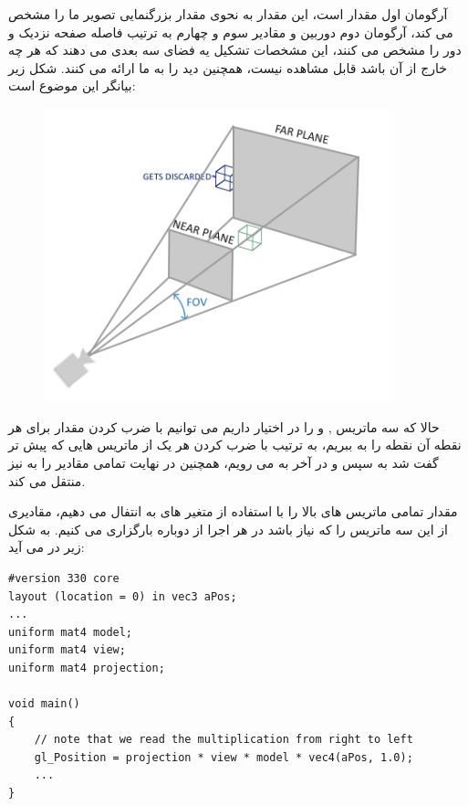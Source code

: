 \documentclass[a4paper, 12pt]{book}
\newcommand{\lrit}[1]{\lr{\textit{#1}}}
\begin{document}
    آرگومان اول مقدار  است، این مقدار به نحوی مقدار بزرگنمایی تصویر ما را مشخص می کند، آرگومان دوم  دوربین و مقادیر سوم و چهارم به ترتیب فاصله صفحه نزدیک و دور را مشخص می کنند، این مشخصات تشکیل یه فضای سه بعدی می دهند که هر چه خارج از آن باشد قابل مشاهده نیست، همچنین دید  را به ما ارائه می کنند.
    شکل زیر بیانگر این موضوع است:

\begin{figure}[ht]
    \centering
    \href{https://learnopengl.com}{
        \includegraphics[width=10cm]{images/perspective_frustum.png}
    }
    \caption{}
    \label{fig:my_label}
\end{figure}

    حالا که سه ماتریس ,  و  را در اختیار داریم می توانیم با ضرب کردن مقدار  برای هر نقطه آن نقطه را به  ببریم، به ترتیب با ضرب کردن هر یک از ماتریس هایی که پیش تر گفت شد به  سپس  و در آخر به  می رویم، همچنین  در نهایت تمامی مقادیر را به  نیز منتقل می کند.\par
    مقدار تمامی ماتریس های بالا را با استفاده از متغیر های  به  انتفال می دهیم، مقادیری از این سه ماتریس را که نیاز باشد در هر اجرا از  دوباره بارگزاری می کنیم. به شکل زیر در می آید:
    \newpage
    \begin{LTR}
    \small
        \begin{lstlisting}[style=C++Style,caption=\lrit{going 3D}]
#version 330 core
layout (location = 0) in vec3 aPos;
...
uniform mat4 model;
uniform mat4 view;
uniform mat4 projection;

void main()
{
    // note that we read the multiplication from right to left
    gl_Position = projection * view * model * vec4(aPos, 1.0);
    ...
}
        \end{lstlisting}
    \end{LTR}
    \normalsize
    \vspace*{0.3cm}
\end{document}
